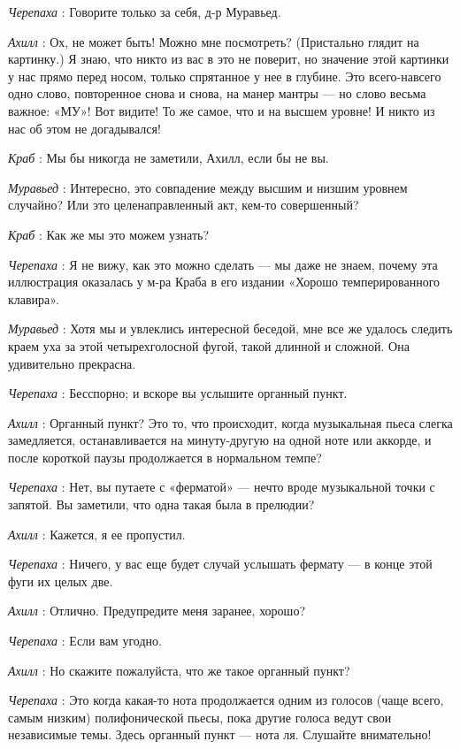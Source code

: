 \documentclass[../main.tex]{subfiles}
\begin{document}
\begin{dialogue}
\emph{Черепаха} : Говорите только за себя, д-р Муравьед.

\emph{Ахилл} : Ох, не может быть! Можно мне посмотреть? (Пристально глядит на картинку.) Я знаю, что никто из вас в это не поверит, но значение этой картинки у нас прямо перед носом, только спрятанное у нее в глубине. Это всего-навсего одно слово, повторенное снова и снова, на манер мантры --- но слово весьма важное: «МУ»! Вот видите! То же самое, что и на высшем уровне! И никто из нас об этом не догадывался!

\emph{Краб} : Мы бы никогда не заметили, Ахилл, если бы не вы.

\emph{Муравьед} : Интересно, это совпадение между высшим и низшим уровнем случайно? Или это целенаправленный акт, кем-то совершенный?

\emph{Краб} : Как же мы это можем узнать?

\emph{Черепаха} : Я не вижу, как это можно сделать --- мы даже не знаем, почему эта иллюстрация оказалась у м-ра Краба в его издании «Хорошо темперированного клавира».

\emph{Муравьед} : Хотя мы и увлеклись интересной беседой, мне все же удалось следить краем уха за этой четырехголосной фугой, такой длинной и сложной. Она удивительно прекрасна.

\emph{Черепаха} : Бесспорно; и вскоре вы услышите органный пункт.

\emph{Ахилл} : Органный пункт? Это то, что происходит, когда музыкальная пьеса слегка замедляется, останавливается на минуту-другую на одной ноте или аккорде, и после короткой паузы продолжается в нормальном темпе?

\emph{Черепаха} : Нет, вы путаете с «ферматой» --- нечто вроде музыкальной точки с запятой. Вы заметили, что одна такая была в прелюдии?

\emph{Ахилл} : Кажется, я ее пропустил.

\emph{Черепаха} : Ничего, у вас еще будет случай услышать фермату --- в конце этой фуги их целых две.

\emph{Ахилл} : Отлично. Предупредите меня заранее, хорошо?

\emph{Черепаха} : Если вам угодно.

\emph{Ахилл} : Но скажите пожалуйста, что же такое органный пункт?

\emph{Черепаха} : Это когда какая-то нота продолжается одним из голосов (чаще всего, самым низким) полифонической пьесы, пока другие голоса ведут свои независимые темы. Здесь органный пункт --- нота ля. Слушайте внимательно!


\end{dialogue}
\end{document}

